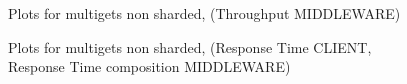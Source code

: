 \documentclass[11pt,a4paper]{article}
\begin{document}
\begin{figure}[!h]
  \centering
    \caption{Plots for multigets non sharded, (Throughput MIDDLEWARE)}
  \label{fig:multigets_non_sharded_mw_tp}
\end{figure}

\begin{figure}[!h]
  \centering
    \caption{Plots for multigets non sharded, (Response Time CLIENT, Response Time composition MIDDLEWARE)}
  \label{fig:multigets_non_sharded_mt_rt}
\end{figure}
\end{document}
